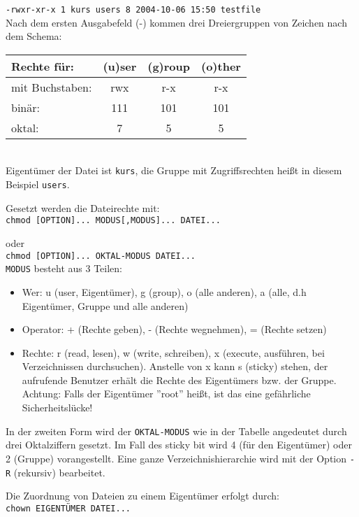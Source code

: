 \documentclass[11pt]{article}
\begin{document}
\texttt{-rwxr-xr-x    1 kurs     users           8 2004-10-06 15:50 testfile } \\

Nach dem ersten Ausgabefeld (-) kommen drei Dreiergruppen von Zeichen
nach dem Schema:

\begin{tabular}{|l|c|c|c|}
\hline
Rechte für: & (u)ser & (g)roup & (o)ther \\
\hline
\hline
mit Buchstaben: & rwx & r-x & r-x \\ 
binär: & 111 & 101 & 101  \\
oktal: & 7 & 5 & 5 \\
\hline
\end{tabular}\\

Eigentümer der Datei ist \texttt{kurs}, die Gruppe mit Zugriffsrechten
heißt in diesem Beispiel \texttt{users}.

Gesetzt werden die Dateirechte mit:\\ 
\texttt{chmod [OPTION]... MODUS[,MODUS]... DATEI...}

oder \\
\texttt{chmod [OPTION]... OKTAL-MODUS DATEI...}\\

\texttt{MODUS} besteht aus 3 Teilen:
\begin{itemize}
\item Wer: u (user, Eigentümer), g (group), o (alle anderen), a (alle,
  d.h Eigentümer, Gruppe und alle anderen)
\item Operator: + (Rechte geben), - (Rechte wegnehmen), = (Rechte
  setzen)
\item Rechte: r (read, lesen), w (write, schreiben), x (execute,
  ausführen, bei Verzeichnissen durchsuchen). Anstelle von x kann s
  (sticky) stehen, der aufrufende Benutzer erhält die Rechte des
  Eigentümers bzw. der Gruppe. Achtung: Falls der Eigentümer ''root''
  heißt, ist das eine gefährliche Sicherheitslücke!
\end{itemize}

In der zweiten Form wird der \texttt{OKTAL-MODUS} wie in der Tabelle
angedeutet durch drei Oktalziffern gesetzt. Im Fall des sticky bit
wird 4 (für den Eigentümer) oder 2 (Gruppe) vorangestellt.  Eine ganze
Verzeichnishierarchie wird mit der Option \texttt{-R} (rekursiv)
bearbeitet.

Die Zuordnung von Dateien zu einem Eigentümer erfolgt durch: \\
\texttt{chown EIGENTÜMER DATEI...}
\end{document}
